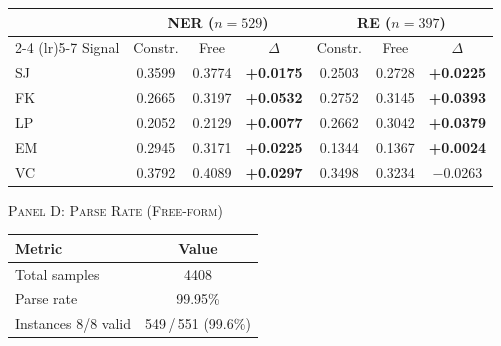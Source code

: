 \begin{table}[t]
\begin{tabular}{l ccc ccc}
\toprule
 & \multicolumn{3}{c}{NER ($n{=}529$)} & \multicolumn{3}{c}{RE ($n{=}397$)} \\
\cmidrule(lr){2-4} \cmidrule(lr){5-7}
Signal & Constr. & Free & $\Delta$ & Constr. & Free & $\Delta$ \\
\midrule
SJ & 0.3599 & 0.3774 & \textbf{+0.0175} & 0.2503 & 0.2728 & \textbf{+0.0225} \\
FK & 0.2665 & 0.3197 & \textbf{+0.0532} & 0.2752 & 0.3145 & \textbf{+0.0393} \\
LP & 0.2052 & 0.2129 & \textbf{+0.0077} & 0.2662 & 0.3042 & \textbf{+0.0379} \\
EM & 0.2945 & 0.3171 & \textbf{+0.0225} & 0.1344 & 0.1367 & \textbf{+0.0024} \\
VC & 0.3792 & 0.4089 & \textbf{+0.0297} & 0.3498 & 0.3234 & $-$0.0263 \\
\bottomrule
\end{tabular}

\vspace{8pt}

{\small\textsc{Panel D: Parse Rate (Free-form)}}
\vspace{2pt}

\begin{tabular}{lc}
\toprule
Metric & Value \\
\midrule
Total samples          & 4408 \\
Parse rate             & 99.95\% \\
Instances 8/8 valid    & 549\,/\,551 (99.6\%) \\
\bottomrule
\end{tabular}

\end{table}
